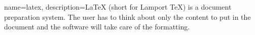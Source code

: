 \usepackage{glossaries}


\makeglossaries

{
    name=latex,
    description={LaTeX (short for Lamport TeX) is a document preparation system. The user has to think about only the 
content to put in the document and the software will take care of the formatting. }
}
